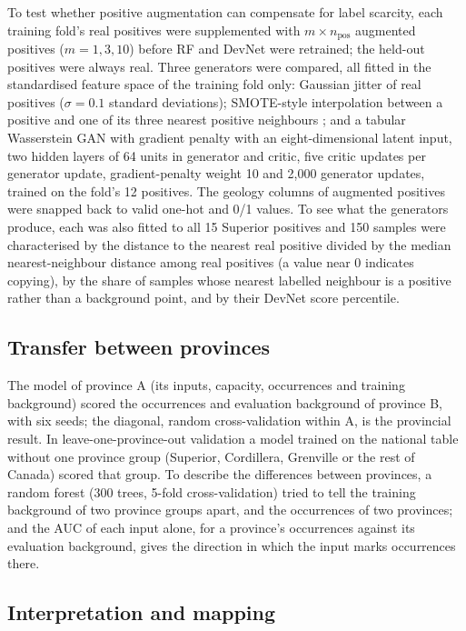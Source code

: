 \documentclass[pdflatex,sn-apa]{sn-jnl}
\begin{document}
To test whether positive augmentation can compensate for label scarcity, each training fold's real positives were supplemented with $m \times n_{\mathrm{pos}}$ augmented positives ($m = 1, 3, 10$) before RF and DevNet were retrained; the held-out positives were always real. Three generators were compared, all fitted in the standardised feature space of the training fold only: Gaussian jitter of real positives ($\sigma = 0.1$ standard deviations); SMOTE-style interpolation between a positive and one of its three nearest positive neighbours \citep{Chawla2002}; and a tabular Wasserstein GAN with gradient penalty \citep[WGAN-GP;][]{Goodfellow2014,Arjovsky2017,Gulrajani2017} with an eight-dimensional latent input, two hidden layers of 64 units in generator and critic, five critic updates per generator update, gradient-penalty weight 10 and 2,000 generator updates, trained on the fold's 12 positives. The geology columns of augmented positives were snapped back to valid one-hot and 0/1 values. To see what the generators produce, each was also fitted to all 15 Superior positives and 150 samples were characterised by the distance to the nearest real positive divided by the median nearest-neighbour distance among real positives (a value near 0 indicates copying), by the share of samples whose nearest labelled neighbour is a positive rather than a background point, and by their DevNet score percentile.

\subsection{Transfer between provinces}\label{sec:transfer-methods}

The model of province A (its inputs, capacity, occurrences and training background) scored the occurrences and evaluation background of province B, with six seeds; the diagonal, random cross-validation within A, is the provincial result. In leave-one-province-out validation a model trained on the national table without one province group (Superior, Cordillera, Grenville or the rest of Canada) scored that group. To describe the differences between provinces, a random forest (300 trees, 5-fold cross-validation) tried to tell the training background of two province groups apart, and the occurrences of two provinces; and the AUC of each input alone, for a province's occurrences against its evaluation background, gives the direction in which the input marks occurrences there.

\subsection{Interpretation and mapping}\label{sec:shap}
\end{document}
